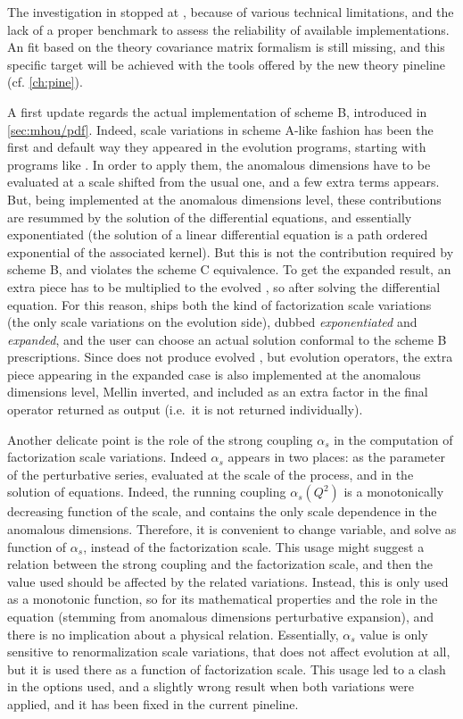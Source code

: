 
The investigation in \cite{NNPDF:2019ubu} stopped at \nlo, because of various
technical limitations, and the lack of a proper benchmark to assess the
reliability of available implementations.
%
An \nnlo fit based on the theory covariance matrix formalism is still missing,
and this specific target will be achieved with the tools offered by the new
theory pineline (cf. \cref{ch:pine}).

A first update regards the actual implementation of scheme B, introduced in
\cref{sec:mhou/pdf}.
Indeed, scale variations in scheme A-like fashion has been the first and
default way they appeared in the evolution programs, starting with programs
like \pegasus.
In order to apply them, the \pdf anomalous dimensions have to be evaluated at a
scale shifted from the usual one, and a few extra terms appears.
%
But, being implemented at the anomalous dimensions level, these contributions
are resummed by the solution of the differential equations, and essentially
exponentiated (the solution of a linear differential equation is a path ordered
exponential of the associated kernel).
%
But this is not the contribution required by scheme B, and violates the scheme
C equivalence.
To get the expanded result, an extra piece has to be multiplied to the evolved
\pdf, so after solving the differential equation.
%
For this reason, \eko ships both the kind of factorization scale variations
(the only scale variations on the evolution side), dubbed
\textit{exponentiated} and \textit{expanded}, and the user can choose an actual
solution conformal to the scheme B prescriptions.
%
Since \eko does not produce evolved \pdfs, but evolution operators, the extra
piece appearing in the expanded case is also implemented at the anomalous
dimensions level, Mellin inverted, and included as an extra factor in the final
operator returned as output (i.e.\ it is not returned individually).

Another delicate point is the role of the strong coupling $\alpha_s$ in the
computation of factorization scale variations.
Indeed $\alpha_s$ appears in two places: as the parameter of the perturbative
series, evaluated at the scale of the process, and in the solution of \dglap
equations.
%
Indeed, the running coupling $\alpha_s(Q^2)$ is a monotonically decreasing
function of the scale, and contains the only scale dependence in the anomalous
dimensions.
Therefore, it is convenient to change variable, and solve \dglap as function of
$\alpha_s$, instead of the factorization scale.
%
This usage might suggest a relation between the strong coupling and the
factorization scale, and then the value used should be affected by the
related variations.
Instead, this is only used as a monotonic function, so for its mathematical
properties and the role in the equation (stemming from anomalous dimensions
perturbative expansion), and there is no implication about a physical relation.
%
Essentially, $\alpha_s$ value is only sensitive to renormalization scale
variations, that does not affect evolution at all, but it is used there as a
function of factorization scale.
This usage led to a clash in the options used, and a slightly wrong result when
both variations were applied, and it has been fixed in the current pineline.

